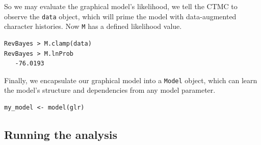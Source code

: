 \documentclass[11pt]{article}
\begin{document}
So we may evaluate the graphical model's likelihood, we tell the CTMC to observe the {\tt data} object, which will prime the model with data-augmented character histories.
Now {\tt M} has a defined likelihood value.
\begin{snugshade}
\begin{lstlisting}
RevBayes > M.clamp(data)
RevBayes > M.lnProb
   -76.0193
\end{lstlisting}
\end{snugshade}

Finally, we encapsulate our graphical model into a {\tt Model} object, which can learn the model's structure and dependencies from any model parameter.
\begin{snugshade}
\begin{lstlisting}
my_model <- model(glr)
\end{lstlisting}
\end{snugshade}

\subsection{Running the analysis}
\end{document}

